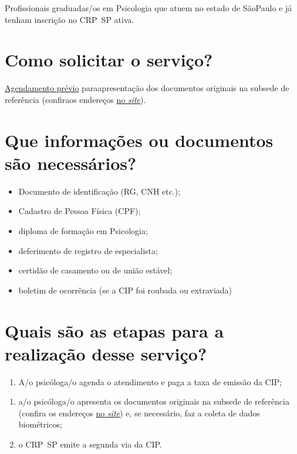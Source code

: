 Profissionais graduadas/os em Psicologia que atuem no estado de SãoPaulo e já tenham inscrição no CRP~SP ativa.

\section{Como solicitar o serviço?}

\href{https://www.crpsp.org/agendamento}{Agendamento prévio} paraapresentação dos documentos originais na subsede de referência (confiraos endereços \href{https://www.crpsp.org/sede/index}{no \emph{site}}).

\section{Que informações ou documentos são necessários?}

\begin{itemize}
  \item  Documento de identificação (RG, CNH etc.);
  \item  Cadastro de Pessoa Física (CPF);
  \item  diploma de formação em Psicologia;
  \item  deferimento de registro de especialista;
  \item  certidão de casamento ou de união estável;
  \item  boletim de ocorrência (se a CIP foi roubada ou extraviada)
\end{itemize}

\section{Quais são as etapas para a realização desse serviço?}

\begin{enumerate}
  \item  A/o psicóloga/o agenda o atendimento e paga a taxa de emissão da CIP;
\end{enumerate}

\begin{enumerate}
  \item  a/o psicóloga/o apresenta os documentos originais na subsede de  referência (confira os endereços  \href{https://www.crpsp.org/sede/index}{no \emph{site}}) e, se  necessário, faz a coleta de dados biométricos;
  \item  o CRP~SP emite a segunda via da CIP.
\end{enumerate}

